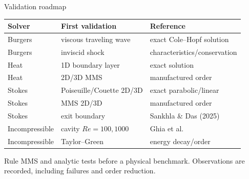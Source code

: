\documentclass[aspectratio=169,10pt]{beamer}
\begin{document}
\begin{frame}{Validation roadmap}
  \begin{center}
    \small
    \begin{tabular}{lll}
      \toprule
      Solver & First validation & Reference \\
      \midrule
      Burgers & viscous traveling wave & exact Cole--Hopf solution \\
      Burgers & inviscid shock & characteristics/conservation \\
      Heat & 1D boundary layer & exact solution \\
      Heat & 2D/3D MMS & manufactured order \\
      Stokes & Poiseuille/Couette 2D/3D & exact parabolic/linear \\
      Stokes & MMS 2D/3D & manufactured order \\
      Stokes & exit boundary & Sankhla \& Das (2025) \\
      Incompressible & cavity $Re=100,1000$ & Ghia et al.\ \cite{ghia1982} \\
      Incompressible & Taylor--Green & energy decay/order \\
      \bottomrule
    \end{tabular}
  \end{center}

  \begin{block}{Rule}
    MMS and analytic tests before a physical benchmark. Observations are
    recorded, including failures and order reduction.
  \end{block}
\end{frame}
\end{document}
